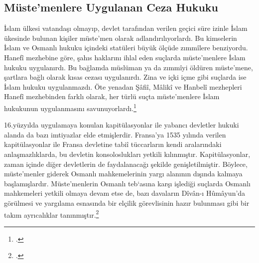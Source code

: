 \subsection{Müste'menlere Uygulanan Ceza Hukuku}
\indent\indent İslam ülkesi vatandaşı olmayıp, devlet tarafından verilen geçici süre izinle İslam ükesinde bulunan kişiler müste'men olarak adlandırılıyorlardı. 
Bu kimselerin İslam ve Osmanlı hukuku içindeki statüleri büyük ölçüde zımmîlere benziyordu. Hanefî mezhebine göre, şahıs haklarını ihlal eden suçlarda 
müste'menlere İslam hukuku uygulanırdı. Bu bağlamda müslüman ya da zımmîyi öldüren müste'mene, şartlara bağlı olarak kısas cezası uygulanırdı. Zina ve 
içki içme gibi suçlarda ise İslam hukuku uygulanmazdı. Öte yenadan Şâfiî, Mâlikî ve Hanbelî mezhepleri Hanefî  mezhebinden farklı olarak, her türlü suçta 
müste'menlere İslam hukukunun uygulanmasını savunuyorlardı.\footcite[324]{osmanli_hukuku}

16.yüzyılda uygulamaya konulan kapitülasyonlar ile yabancı devletler hukuki alanda da bazı imtiyazlar elde etmişlerdir. Fransa'ya 1535 yılında verilen 
kapitülasyonlar ile Fransa devletine tabiî tüccarların kendi aralarındaki anlaşmazlıklarda, bu devletin konsoloslukları yetkili kılınmıştır. Kapitülasyonlar,
zaman içinde diğer devletlerin de faydalanacağı şekilde genişletilmiştir. Böylece, müste'menler giderek Osmanlı mahkemelerinin yargı alanının dışında kalmaya 
başlamışlardır. Müste'menlerin Osmanlı teb`asına karşı işlediği suçlarda Osmanlı mahkemeleri yetkili olmaya devam etse de, bazı davaların Dîvân-ı Hûmâyun'da 
görülmesi ve yargılama esnasında bir elçilik görevlisinin hazır bulunması gibi bir takım ayrıcalıklar tanınmıştır.\footcite[325]{osmanli_hukuku}